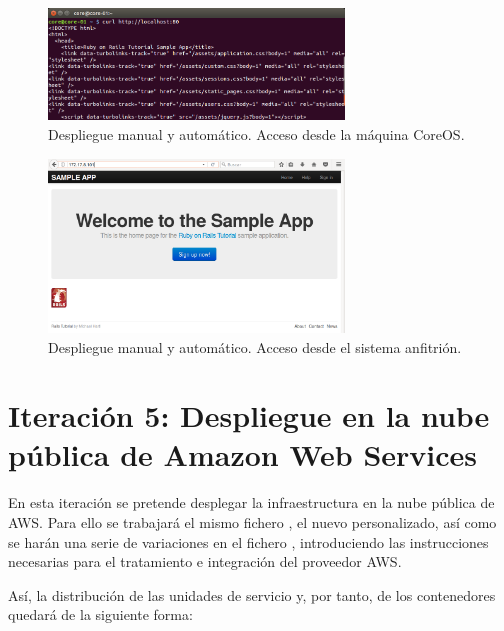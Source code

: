 \begin{figure}[H]
\centering
\includegraphics[width=0.7\textwidth]{images/figures/coreosmanualcurl.png}
\caption{Despliegue manual y automático. Acceso desde la máquina CoreOS.}
\end{figure}

\begin{figure}[H]
\centering
\includegraphics[width=0.7\textwidth]{images/figures/coreosmanualhost.png}
\caption{Despliegue manual y automático. Acceso desde el sistema anfitrión.}
\end{figure}

\section[Iteración 5: Despliegue en Amazon Web Services]{Iteración 5: Despliegue en la nube pública de Amazon Web Services}

En esta iteración se pretende desplegar la infraestructura en la nube pública de AWS. Para ello se trabajará el mismo fichero , el nuevo  personalizado, así como se harán una serie de variaciones en el fichero , introduciendo las instrucciones necesarias para el tratamiento e integración del proveedor AWS.

Así, la distribución de las unidades de servicio y, por tanto, de los contenedores quedará de la siguiente forma:

